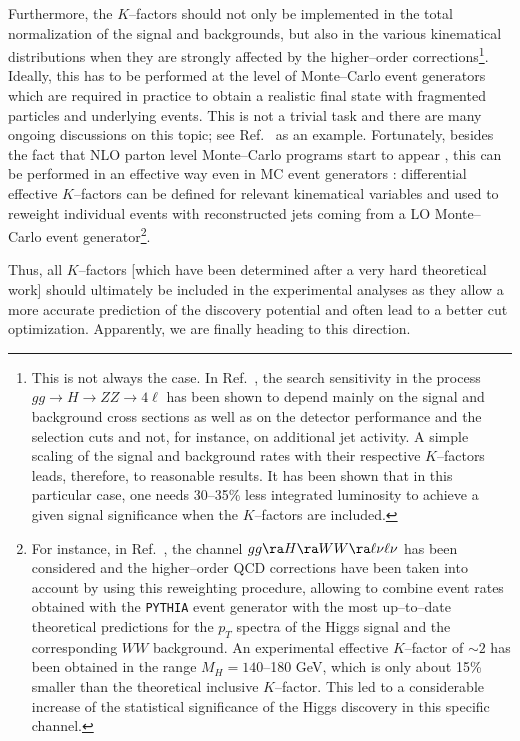 Furthermore, the $K$--factors should not only be implemented in the total
normalization of the signal and backgrounds, but also in the various
kinematical distributions when they are strongly affected by the higher--order
corrections\footnote{This is not always the case. In Ref.~\cite{K-Mellado}, the
search sensitivity in the process $gg \to H \to ZZ \to 4\ell$ has been shown to
depend mainly on the signal and background cross sections as well as on the
detector performance and the selection cuts and not, for instance, on
additional jet activity. A simple scaling of the signal and background rates
with their respective $K$--factors leads,  therefore, to reasonable results. 
It has been shown that in this particular case, one needs 30--35\% less
integrated luminosity to achieve a given signal significance when the
$K$--factors are included.}. Ideally, this has to be performed at the level of
Monte--Carlo event generators which are required in practice to obtain a
realistic final state with fragmented particles and underlying events. This is
not a trivial task and there are many ongoing discussions on this topic; see
Ref.~\cite{Houches-QCD} as an example. Fortunately, besides the fact that
NLO parton level Monte--Carlo programs start to appear 
\cite{pp-ggH-eta2,pp-MCFM,MC-WWNLO}, this can be
performed in an effective way even in MC event generators
\cite{K-Mellado,K-Michael}: differential effective $K$--factors can be defined
for relevant kinematical variables and used to reweight individual events with
reconstructed jets coming from a LO Monte--Carlo event generator\footnote{For
instance, in Ref.~\cite{K-Michael}, the channel $gg \ra H \ra W W \ra \ell 
\nu \ell \nu$ has been considered and the higher--order QCD corrections
have been taken into account by using this reweighting procedure, allowing to
combine event rates obtained with the {\tt PYTHIA} event generator with the most
up--to--date theoretical predictions for the $p_T$ spectra of the Higgs signal
and the corresponding $WW$ background. An experimental effective $K$--factor of
$\sim 2$ has been obtained in the range $M_H=140$--180 GeV, which is only about
15\% smaller than the theoretical inclusive $K$--factor. This led to a
considerable increase of the statistical significance of the Higgs discovery
in this specific channel.}.\s

Thus, all $K$--factors [which have been determined after a very hard
theoretical work]  should ultimately be included in the experimental analyses
as they allow a more accurate prediction of the discovery potential and often
lead to a better cut optimization.  Apparently, we are finally heading to this
direction.  

